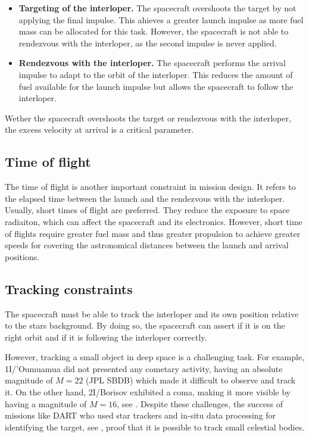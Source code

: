 \begin{itemize}

  \item \textbf{Targeting of the interloper.} The spacecraft overshoots the target by
        not applying the final impulse. This ahieves a greater launch
        impulse as more fuel mass can be allocated for this task. However, the
        spacecraft is not able to rendezvous with the interloper, as the second
        impulse is never applied.

  \item \textbf{Rendezvous with the interloper.} The spacecraft performs the
        arrival impulse to adapt to the orbit of the interloper. This reduces the
        amount of fuel available for the launch impulse but allows the spacecraft to
        follow the interloper.

\end{itemize}

Wether the spacecraft overshoots the target or rendezvous with the interloper,
the excess velocity at arrival is a critical parameter.

\subsection{Time of flight}

The time of flight is another important constraint in mission design. It refers
to the elapsed time between the launch and the rendezvous with the interloper.
Usually, short times of flight are preferred. They reduce the exposure to space
radiaiton, which can affect the spacecraft and its electronics. However, short
time of flights require greater fuel mass and thus greater propulsion to achieve
greater speeds for covering the astronomical distances between the launch and
arrival positions.

\subsection{Tracking constraints}

The spacecraft must be able to track the interloper and its own position
relative to the stars background. By doing so, the spacecraft can assert if it
is on the right orbit and if it is following the interloper correctly.

However, tracking a small object in deep space is a challenging task. For
example, 1I/'Oumuamua did not presented any cometary activity, having an
absolute magnitude of $M = 22$ (JPL SBDB) which made it difficult to observe and
track it. On the other hand, 2I/Borisov exhibited a coma, making it more visible
by having a magnitude of $M = 16$, see \cite{jewitt2020}. Despite these
challenges, the success of missions like DART who used star trackers and in-situ
data processing for identifying the target, see \cite{daly2023}, proof that it
is possible to track small celestial bodies.
